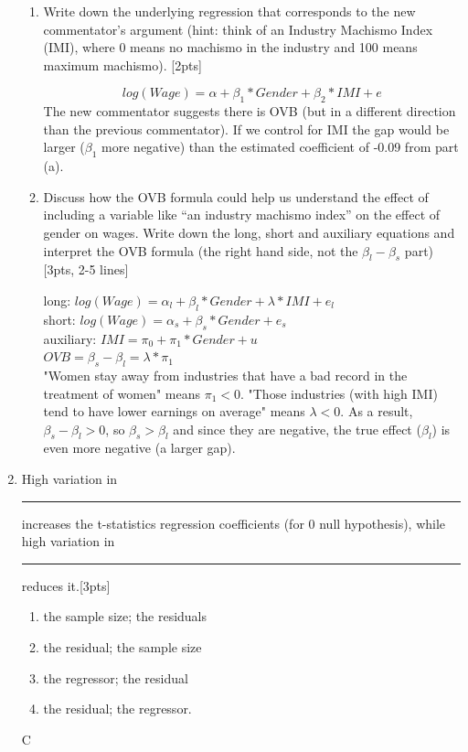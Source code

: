 \documentclass[answers]{exam}
\begin{document}
\begin{enumerate}
\begin{enumerate}[label=\alph*)]
\item Write down the underlying regression that corresponds to the new commentator’s argument (hint: think of an Industry Machismo Index (IMI), where 0 means no machismo in the industry and 100 means maximum machismo). [2pts]
\begin{solution}

$$log(Wage) = \alpha + \beta_{1} * Gender + \beta_{2} * IMI + e$$ 
The new commentator suggests there is OVB (but in a different direction than the previous commentator). If we control for IMI the gap would be larger ($\beta_{1}$ more negative) than the estimated coefficient of -0.09 from part (a).
\end{solution}


\item Discuss how the OVB formula could help us understand the effect of including a variable like “an industry machismo index” on the effect of gender on wages. Write down the long, short and auxiliary equations and interpret the OVB formula (the right hand side, not the $\beta_{l} -  \beta_{s}$ part) [3pts, 2-5 lines]
\begin{solution}

long: $log(Wage) = \alpha_{l} + \beta_{l} * Gender + \lambda* IMI + e_{l}$\\
short: $log(Wage) = \alpha_{s} + \beta_{s} * Gender + e_{s}$\\
auxiliary: 
$IMI = \pi_{0} + \pi_{1} * Gender +u$\\
$OVB= \beta_{s}-\beta_{l} = \lambda * \pi_{1}  $\\

"Women stay away from industries that have a bad record in the treatment of women" means $\pi_{1} <0$. "Those industries (with high IMI) tend to have lower earnings on average" means $\lambda <0$. As a result, $\beta_{s}-\beta_{l} >0$, so $\beta_{s}>\beta_{l}$ and since they are negative, the true effect ($\beta_{l}$) is even more negative (a larger gap). 
\end{solution}
 \end{enumerate}

\item High variation in \rule{1cm}{0.15mm}  increases the t-statistics regression coefficients (for 0 null hypothesis), while high variation in \rule{1cm}{0.15mm} reduces it.[3pts] 
\begin{enumerate}[label=\alph*)]
    \item the sample size; the residuals
    \item the residual; the sample size
    \item the regressor; the residual
    \item the residual; the regressor. 
\end{enumerate}
\begin{solution}
C
\end{solution}



\end{enumerate}
\end{document}
